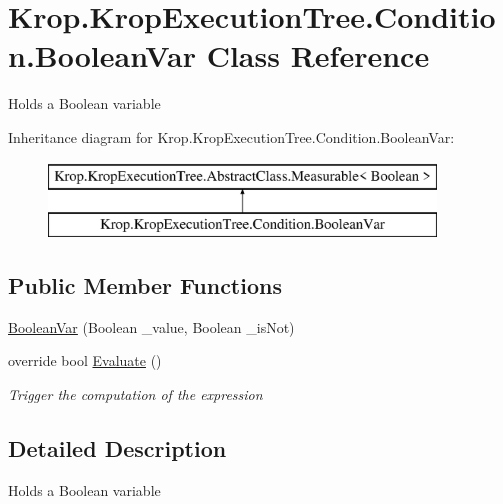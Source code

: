 \hypertarget{class_krop_1_1_krop_execution_tree_1_1_condition_1_1_boolean_var}{}\section{Krop.\+Krop\+Execution\+Tree.\+Condition.\+Boolean\+Var Class Reference}
\label{class_krop_1_1_krop_execution_tree_1_1_condition_1_1_boolean_var}


Holds a Boolean variable  


Inheritance diagram for Krop.\+Krop\+Execution\+Tree.\+Condition.\+Boolean\+Var\+:\begin{figure}[H]
\begin{center}
\leavevmode
\includegraphics[height=2.000000cm]{class_krop_1_1_krop_execution_tree_1_1_condition_1_1_boolean_var}
\end{center}
\end{figure}
\subsection*{Public Member Functions}
\begin{DoxyCompactItemize}
\item 
\mbox{\hyperlink{class_krop_1_1_krop_execution_tree_1_1_condition_1_1_boolean_var_a33fb9a2ae3f57a06519bc3a300b602d6}{Boolean\+Var}} (Boolean \+\_\+value, Boolean \+\_\+is\+Not)
\item 
override bool \mbox{\hyperlink{class_krop_1_1_krop_execution_tree_1_1_condition_1_1_boolean_var_a293790e0485139dcf84fe9c35a5bac4a}{Evaluate}} ()
\begin{DoxyCompactList}\small\item\em Trigger the computation of the expression \end{DoxyCompactList}\end{DoxyCompactItemize}


\subsection{Detailed Description}
Holds a Boolean variable 



